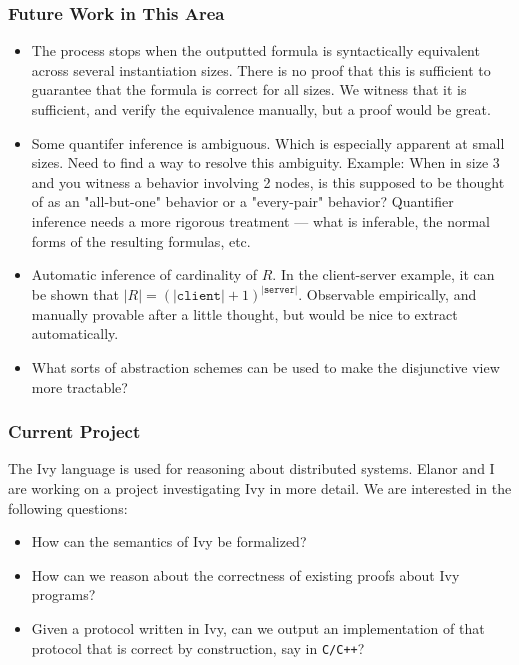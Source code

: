 \documentclass{beamer}
\begin{document}
\begin{frame}
    \frametitle{Future Work in This Area}
    \begin{itemize}
        \item The process stops when the outputted formula is syntactically equivalent across several instantiation sizes. There is no proof that this is sufficient to guarantee that the formula is correct for all sizes. We witness that it is sufficient, and verify the equivalence manually, but a proof would be great.
        \item Some quantifer inference is ambiguous. Which is especially apparent at small sizes. Need to find a way to resolve this ambiguity. Example: When in size 3 and you witness a behavior involving 2 nodes, is this supposed to be thought of as an "all-but-one" behavior or a "every-pair" behavior? Quantifier inference needs a more rigorous treatment --- what is inferable, the normal forms of the resulting formulas, etc.
        \item Automatic inference of cardinality of $R$. In the client-server example, it can be shown that $|R| = (|\texttt{client}| + 1)^{|\texttt{server}|}$. Observable empirically, and manually provable after a little thought, but would be nice to extract automatically.
        \item What sorts of abstraction schemes can be used to make the disjunctive view more tractable?
    \end{itemize}
\end{frame}

\begin{frame}
    \frametitle{Current Project}
    The Ivy language is used for reasoning about distributed systems. Elanor and I are working on a project investigating Ivy in more detail. We are interested in the following questions:
    \begin{itemize}
        \item How can the semantics of Ivy be formalized?
        \item How can we reason about the correctness of existing proofs about Ivy programs?
        \item Given a protocol written in Ivy, can we output an implementation of that protocol that is correct by construction, say in \texttt{C/C++}?
    \end{itemize}

\end{frame}
\end{document}

